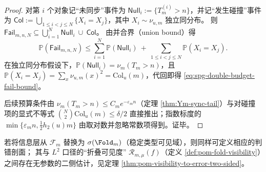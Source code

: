 \begin{proof}
对第 \(i\) 个对象记“未同步”事件为 \(\mathsf{Null}_i:=\{T_m^{(i)}>n\}\)，并记“发生碰撞”事件为
\(
\mathsf{Col}:=\bigcup_{1\le i<j\le N}\{X_i=X_j\}
\)，其中 \(X_i\sim\nu_{u,m}\) 独立同分布。
则
\(
\mathsf{Fail}_{m,n,N}\subseteq \bigcup_{i=1}^N \mathsf{Null}_i\ \cup\ \mathsf{Col}
\)。
由并合界（union bound）得
\[
\mathbb{P}(\mathsf{Fail}_{m,n,N})
\le
\sum_{i=1}^N \mathbb{P}(\mathsf{Null}_i)
\ +\
\sum_{1\le i<j\le N}\mathbb{P}(X_i=X_j).
\]
在独立同分布假设下，\(\mathbb{P}(\mathsf{Null}_i)=\nu_m(T_m>n)\)，且
\(
\mathbb{P}(X_i=X_j)=\sum_x\nu_{u,m}(x)^2=\mathrm{Col}_u(m)
\)，代回即得 \eqref{eq:spg-double-budget-fail-bound}。
\par
后续预算条件由 \(\nu_m(T_m>n)\le C_m e^{-\varepsilon_m n}\)（定理 \ref{thm:Ym-sync-tail}）与对碰撞项的显式不等式 \(\binom{N}{2}\mathrm{Col}_u(m)\le \delta/2\) 直接推出；指数标度的 \(\min\{\varepsilon_m n,\tfrac12 h_2(u)m\}\) 由取对数并忽略常数项得到。证毕。
\end{proof}

\begin{remark}[与折叠可见度的接口]\label{rem:spg-visibility-interface}
若将信息层从 $\mathcal{F}_m$ 替换为 $\sigma(\Fold_m)$（稳定类型可见域），则同样可定义相应的判错剖面；
其与 $L^2$ 口径的“折叠可见度” $\mathcal{R}_{m,\mu}(f)$（定义 \ref{def:pom-fold-visibility}）之间存在无参数的二侧估计，见定理 \ref{thm:pom-visibility-to-error-two-sided}。
\end{remark}
